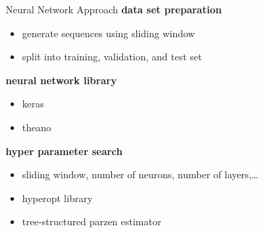 \documentclass{beamer}
\begin{document}
  \begin{frame}{Neural Network Approach}
    \textbf{data set preparation}
    \begin{itemize}
     \item generate sequences using sliding window 
     \item split into training, validation, and test set
    \end{itemize}
  
    \textbf{neural network library}
    \begin{itemize}
      \item keras 
      \item theano
    \end{itemize}
    
    \textbf{hyper parameter search}
    \begin{itemize}
     \item sliding window, number of neurons, number of layers,\ldots
     \item hyperopt library
     \item tree-structured parzen estimator
    \end{itemize}
  \end{frame}
  
\end{document}

